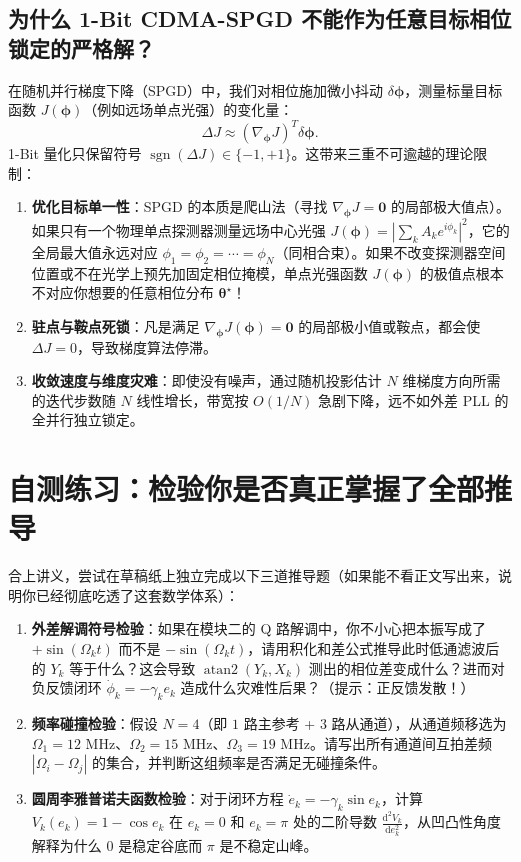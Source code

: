 \documentclass[UTF8, a4paper, 11pt]{ctexart}
\newcommand{\dd}{\mathrm{d}}
\DeclareMathOperator{\sgn}{sgn}
\begin{document}
\subsection{为什么 1-Bit CDMA-SPGD 不能作为任意目标相位锁定的严格解？}

在随机并行梯度下降（SPGD）中，我们对相位施加微小抖动 $\delta\bm{\phi}$，测量标量目标函数 $J(\bm{\phi})$（例如远场单点光强）的变化量：
\[
    \Delta J \approx (\nabla_{\bm{\phi}} J)^T \delta\bm{\phi}.
\]
1-Bit 量化只保留符号 $\sgn(\Delta J) \in \{-1, +1\}$。这带来三重不可逾越的理论限制：
\begin{enumerate}
    \item \textbf{优化目标单一性}：SPGD 的本质是爬山法（寻找 $\nabla_{\bm{\phi}} J = \bm{0}$ 的局部极大值点）。如果只有一个物理单点探测器测量远场中心光强 $J(\bm{\phi}) = \left|\sum_k A_k e^{i\phi_k}\right|^2$，它的全局最大值永远对应 $\phi_1 = \phi_2 = \cdots = \phi_N$（同相合束）。如果不改变探测器空间位置或不在光学上预先加固定相位掩模，单点光强函数 $J(\bm{\phi})$ 的极值点根本不对应你想要的任意相位分布 $\bm{\theta}^\star$！
    \item \textbf{驻点与鞍点死锁}：凡是满足 $\nabla_{\bm{\phi}} J(\bm{\phi}) = \bm{0}$ 的局部极小值或鞍点，都会使 $\Delta J = 0$，导致梯度算法停滞。
    \item \textbf{收敛速度与维度灾难}：即使没有噪声，通过随机投影估计 $N$ 维梯度方向所需的迭代步数随 $N$ 线性增长，带宽按 $O(1/N)$ 急剧下降，远不如外差 PLL 的全并行独立锁定。
\end{enumerate}

\newpage
\section{自测练习：检验你是否真正掌握了全部推导}

合上讲义，尝试在草稿纸上独立完成以下三道推导题（如果能不看正文写出来，说明你已经彻底吃透了这套数学体系）：

\begin{enumerate}[label=\textbf{练习 \arabic*：}]
    \item \textbf{外差解调符号检验}：如果在模块二的 Q 路解调中，你不小心把本振写成了 $+\sin(\Omega_k t)$ 而不是 $-\sin(\Omega_k t)$，请用积化和差公式推导此时低通滤波后的 $Y_k$ 等于什么？这会导致 $\operatorname{atan2}(Y_k, X_k)$ 测出的相位差变成什么？进而对负反馈闭环 $\dot{\phi}_k = -\gamma_k e_k$ 造成什么灾难性后果？（提示：正反馈发散！）
    \item \textbf{频率碰撞检验}：假设 $N=4$（即 $1$ 路主参考 + $3$ 路从通道），从通道频移选为 $\Omega_1 = 12\text{ MHz}$、$\Omega_2 = 15\text{ MHz}$、$\Omega_3 = 19\text{ MHz}$。请写出所有通道间互拍差频 $|\Omega_i - \Omega_j|$ 的集合，并判断这组频率是否满足无碰撞条件。
    \item \textbf{圆周李雅普诺夫函数检验}：对于闭环方程 $\dot{e}_k = -\gamma_k \sin e_k$，计算 $V_k(e_k) = 1 - \cos e_k$ 在 $e_k = 0$ 和 $e_k = \pi$ 处的二阶导数 $\frac{\dd^2 V_k}{\dd e_k^2}$，从凹凸性角度解释为什么 $0$ 是稳定谷底而 $\pi$ 是不稳定山峰。
\end{enumerate}
\end{document}
